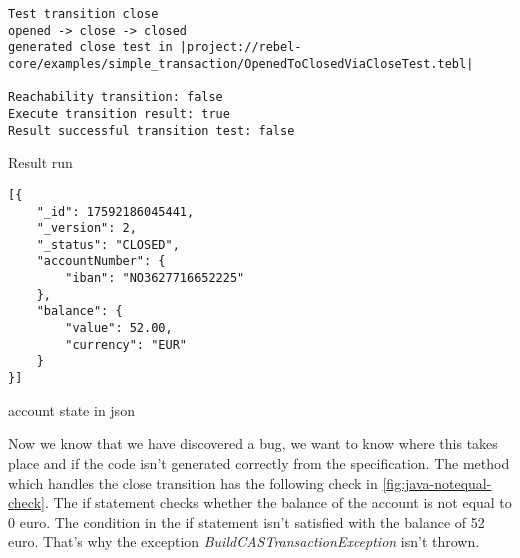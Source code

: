 

\begin{sourcecode}[h!]
\begin{lstlisting}[]
Test transition close
opened -> close -> closed
generated close test in |project://rebel-core/examples/simple_transaction/OpenedToClosedViaCloseTest.tebl|

Reachability transition: false
Execute transition result: true
Result successful transition test: false
\end{lstlisting}
\caption{Result run}
\label{fig:result-close-account}
\end{sourcecode}

\begin{sourcecode}[h!]
\begin{lstlisting}[]
[{
	"_id": 17592186045441,
	"_version": 2,
	"_status": "CLOSED",
	"accountNumber": {
		"iban": "NO3627716652225"
	},
	"balance": {
		"value": 52.00,
		"currency": "EUR"
	}
}]
\end{lstlisting}
\caption{account state in json}
\label{fig:closed-account-json}
\end{sourcecode}









Now we know that we have discovered a bug, we want to know where this takes
place and if the code isn't generated correctly from the specification. The
method which handles the close transition has the following check in
\autoref{fig:java-notequal-check}. The if statement checks whether the balance
of the account is not equal to 0 euro. The condition in the if statement isn't
satisfied with the balance of 52 euro. That's why the exception
\textit{BuildCASTransactionException} isn't thrown.

